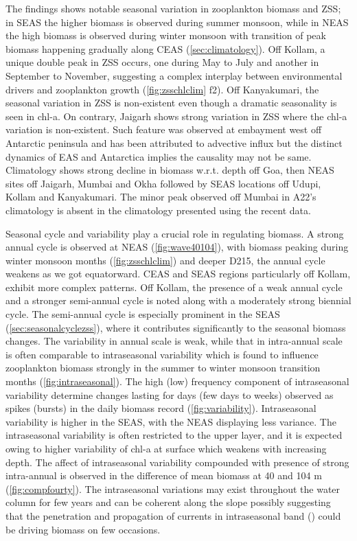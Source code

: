 \documentclass{article}
\begin{document}
	The findings shows notable seasonal variation in zooplankton biomass and ZSS; in SEAS the higher biomass is observed during summer monsoon, while in NEAS the high biomass is observed during winter monsoon with transition of peak biomass happening gradually along CEAS (\autoref{sec:climatology}). Off Kollam, a unique double peak in ZSS occurs, one during May to July and another in September to November, suggesting a complex interplay between environmental drivers and zooplankton growth (\cref{fig:zsschlclim} f2). Off Kanyakumari, the seasonal variation in ZSS is non-existent even though a dramatic seasonality is seen in chl-a. On contrary, Jaigarh shows strong variation in ZSS where the chl-a variation is non-existent. Such feature was observed at embayment west off Antarctic peninsula and has been attributed to advective influx \citep{espinasse2012austral} but the distinct dynamics of EAS and Antarctica implies the causality may not be same. Climatology shows strong decline in biomass w.r.t. depth off Goa, then NEAS sites off Jaigarh, Mumbai and Okha followed by SEAS locations off Udupi, Kollam and Kanyakumari. The minor peak observed off Mumbai in A22's climatology is absent in the climatology presented using the recent data.
	
	Seasonal cycle and variability play a crucial role in regulating biomass. A strong annual cycle is observed at NEAS (\cref{fig:wave40104}), with biomass peaking during winter monsoon months (\cref{fig:zsschlclim}) and deeper D215, the annual cycle weakens as we got equatorward. CEAS and SEAS regions particularly off Kollam, exhibit more complex patterns. Off Kollam, the presence of a weak annual cycle and a stronger semi-annual cycle is noted along with a moderately strong biennial cycle. The semi-annual cycle is especially prominent in the SEAS (\autoref{sec:seasonalcyclezss}), where it contributes significantly to the seasonal biomass changes. The variability in annual scale is weak, while that in intra-annual scale is often comparable to intraseasonal variability which is found to influence zooplankton biomass strongly in the summer to winter monsoon transition months (\cref{fig:intraseasonal}). The high (low) frequency component of intraseasonal variability determine changes lasting for days (few days to weeks) observed as spikes (bursts) in the daily biomass record (\cref{fig:variability}). Intraseasonal variability is higher in the SEAS, with the NEAS displaying less variance. The intraseasonal variability is often restricted to the upper layer, and it is expected owing to higher variability of chl-a at surface which weakens with increasing depth. The affect of intraseasonal variability compounded with presence of strong intra-annual is observed in the difference of mean biomass at 40 and 104 m (\cref{fig:compfourty}). The intraseasonal variations may exist throughout the water column for few years and can be coherent along the slope possibly suggesting that the penetration and propagation of currents in intraseasonal band (\citep{amol2012observational,amol2014observed,chaudhuri2020observed}) could be driving biomass on few occasions.   
	
\end{document}
